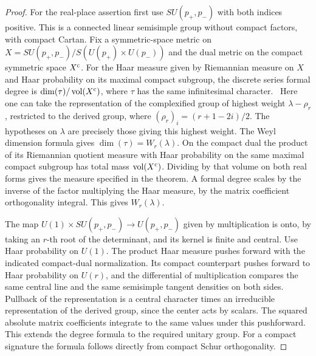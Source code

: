 \documentclass[a4paper,11pt]{article}
\theoremstyle{definition}
\theoremstyle{remark}
\numberwithin{equation}{section}
\begin{document}
\begin{proof}
For the real-place assertion first use \(SU(p_+,p_-)\) with
both indices positive. This is a connected linear semisimple
group without compact factors, with compact Cartan. Fix a
symmetric-space metric on \(X=SU(p_+,p_-)/S(U(p_+)\times U(p_-))\)
and the dual metric on the compact symmetric space \(X^{\rm c}\).
For the Haar measure given by Riemannian measure on \(X\) and
Haar probability on its maximal compact subgroup, the discrete
series formal degree is
\(\dim(\tau)/\operatorname{vol}(X^{\rm c})\), where \(\tau\)
has the same infinitesimal character.~\cite[Cor.~5.2]{XVIII-XIII-I-olbrich91}
Here one can take the representation of the complexified group
of highest weight \(\lambda-\rho_r\), restricted to the derived
group, where \((\rho_r)_i=(r+1-2i)/2\). The hypotheses on
\(\lambda\) are precisely those giving this highest weight.
The Weyl dimension formula gives \(\dim(\tau)=W_r(\lambda)\).
On the compact dual the product of its Riemannian quotient
measure with Haar probability on the same maximal compact
subgroup has total mass \(\operatorname{vol}(X^{\rm c})\).
Dividing by that volume on both real forms gives the measure
specified in the theorem. A formal degree scales by the inverse
of the factor multiplying the Haar measure, by the matrix
coefficient orthogonality integral. This gives \(W_r(\lambda)\).

The map \(U(1)\times SU(p_+,p_-)\to U(p_+,p_-)\) given by
multiplication is onto, by taking an \(r\)-th root of the
determinant, and its kernel is finite and central. Use Haar
probability on \(U(1)\). The product Haar measure pushes forward
with the indicated compact-dual normalization. Its compact
counterpart pushes forward to Haar probability on
\(U(r)\), and the differential of multiplication compares the
same central line and the same semisimple tangent densities
on both sides. Pullback of the representation is a central
character times an irreducible representation of the derived
group, since the center acts by scalars. The squared absolute
matrix coefficients integrate to the same values under this
pushforward. This extends the degree formula to the required
unitary group. For a compact signature the formula follows
directly from compact Schur orthogonality.
\end{proof}
\end{document}
